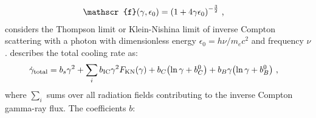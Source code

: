 \begin{equation}
    \begin{aligned}
    \mathscr{f}\qty(\gamma,\epsilon_0)&=\qty(1+4\gamma\epsilon_0)^{-\frac{3}{2}}\text{ ,}
    \end{aligned}
\end{equation}
\noindent considers the Thompson limit or Klein-Nishina limit of inverse Compton scattering with a photon with dimensionless energy $\epsilon_0=h\nu/m_ec^2$ and frequency $\nu$. \cite{2007A&A...474..689M} describes the total cooling rate as:
\begin{equation}
    \begin{aligned}
    \dot{\gamma}_\text{total}&=b_s\gamma^2+\sum_{i} b_\text{IC}\gamma^2F_\text{KN}\qty(\gamma)+b_C\qty(\ln \gamma+b_C^0)+b_B\gamma\qty(\ln\gamma+b_B^0) \text{ ,}
    \end{aligned} \label{eq:chapter_1_non_thermal_leptonic_cooling_rate}
\end{equation}
where $\sum_{i}$ sums over all radiation fields contributing to the inverse Compton gamma-ray flux. The coefficients $b$:

